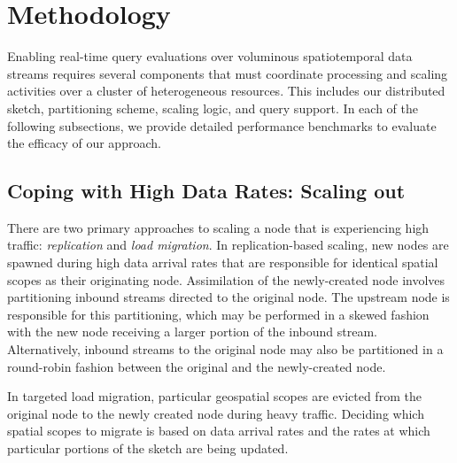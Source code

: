 \section{Methodology}
\label{sec:methodology}
Enabling real-time query evaluations over voluminous spatiotemporal data streams requires several components that must coordinate processing and scaling activities over a cluster of heterogeneous resources. This includes our distributed sketch, partitioning scheme, scaling logic, and query support. In each of the following subsections, we provide detailed performance benchmarks to evaluate the efficacy of our approach.





\subsection{Coping with High Data Rates: Scaling out}
\label{subsec:scaling-out}
There are two primary approaches to scaling a node that is experiencing high traffic: \emph{replication} and \emph{load migration}. In replication-based scaling, new nodes are spawned during high data arrival rates that are responsible for identical spatial scopes as their originating node. Assimilation of the newly-created node involves partitioning inbound streams directed to the original node. The upstream node is responsible for this partitioning, which may be performed in a skewed fashion with the new node receiving a larger portion of the inbound stream.  Alternatively, inbound streams to the original node may also be partitioned in a round-robin fashion between the original and the newly-created node.

In targeted load migration, particular geospatial scopes are evicted from the original node to the newly created node during heavy traffic. Deciding which spatial scopes to migrate is based on data arrival rates and the rates at which particular portions of the sketch are being updated.


